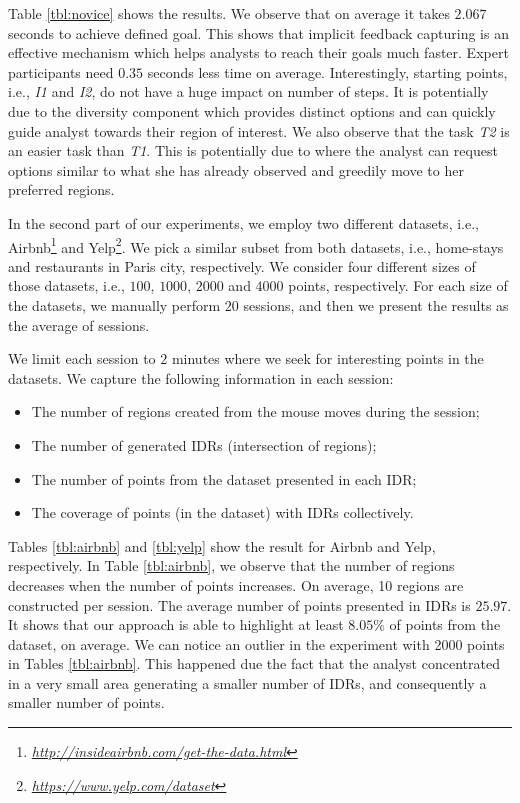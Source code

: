 \documentclass[sigconf,edbt]{acmart-edbt2019}
\begin{document}
\vspace{2pt}
Table \ref{tbl:novice} shows the results. We observe that on average it takes $2.067$ seconds to achieve defined goal. This shows that implicit feedback capturing is an effective mechanism which helps analysts to reach their goals much faster. Expert participants need $0.35$ seconds less time on average. Interestingly, starting points, i.e., {\em I1} and {\em I2}, do not have a huge impact on number of steps. It is potentially due to the diversity component which provides distinct options and can quickly guide analyst towards their region of interest. We also observe that the task {\em T2} is an easier task than {\em T1}. This is potentially due to  where the analyst can request options similar to what she has already observed and greedily move to her preferred regions.

\vspace{2pt}
In the second part of our experiments, we employ two different datasets, i.e., Airbnb\footnote{\it \url{http://insideairbnb.com/get-the-data.html}} and Yelp\footnote{\it \url{https://www.yelp.com/dataset}}. We pick a similar subset from both datasets, i.e., home-stays and restaurants in Paris city, respectively. We consider four different sizes of those datasets, i.e., $100$, $1000$, $2000$ and $4000$ points, respectively. For each size of the datasets, we manually perform $20$ sessions, and then we present the results as the average of sessions.

\vspace{2pt}
We limit each session to $2$ minutes where we seek for interesting points in the datasets. We capture the following information in each session:

\begin{itemize}[leftmargin=*]
  \item The number of regions created from the mouse moves during the session;
  \item The number of generated IDRs (intersection of regions);
  \item The number of points from the dataset presented in each IDR;
  \item The coverage of points (in the dataset) with IDRs collectively.
\end{itemize}  

\vspace{2pt}
Tables \ref{tbl:airbnb} and \ref{tbl:yelp} show the result for Airbnb and Yelp, respectively. In Table \ref{tbl:airbnb}, we observe that the number of regions decreases when the number of points increases. On average, 10 regions are constructed per session. The average number of points presented in IDRs is $25.97$. It shows that our approach is able to highlight at least $8.05\%$ of points from the dataset, on average. 
We can notice an outlier in the experiment with 2000 points  in Tables \ref{tbl:airbnb}. This happened due the fact that  the analyst concentrated in a very small area generating a smaller number of IDRs, and consequently a smaller number of points.
 
\end{document}
